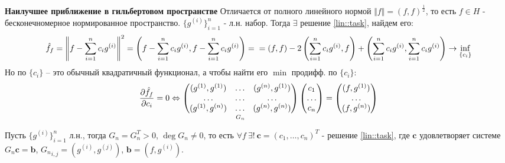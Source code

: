 \textbf{Наилучшее приближение в гильбертовом пространстве}
Отличается от полного линейного нормой $\Vert f\Vert=(f,f)^{\frac{1}{2}}$,
то есть $f\in H$ - бесконечномерное нормированное пространство.
$\{g^{(i)}\}^n_{i=1}$ - л.н. набор. Тогда
$\exists$ решение \eqref{lin::task}, найдем его:
\begin{equation*}
  \hat{f}_f=\left\Vert f-\sum_{i=1}^nc_ig^{(i)}\right\Vert^2 = \left(f-\sum_{i=1}^nc_ig^{(i)}, f-\sum_{i=1}^nc_ig^{(i)}\right)= \\
  = (f,f)-2\left(\sum_{i=1}^nc_ig^{(i)}, f\right)+\left(\sum_{i=1}^nc_ig^{(i)}, \sum_{i=1}^nc_ig^{(i)}\right)\rightarrow\inf_{\{c_i\}}
\end{equation*}
Но по $\{c_i\}$ -- это обычный квадратичный функционал, а чтобы найти его $\min$ продифф. по $\{c_i\}$:
\begin{equation*}
  \frac{\partial \hat{f}_f}{\partial c_i} = 0\Leftrightarrow  \\
  \underset{G_n}{\begin{pmatrix}
      (g^{(1)},g^{(1)}) & \ldots & (g^{(n)},g^{(1)}) \\
      \ldots            & \ldots & \ldots            \\
      (g^{(1)},g^{(n)}) & \ldots & (g^{(n)},g^{(n)})
    \end{pmatrix}}
  \begin{pmatrix}
    c_1    \\
    \ldots \\
    c_n
  \end{pmatrix} =
  \begin{pmatrix}
    (f,g^{(1)}) \\
    \ldots      \\
    (f,g^{(n)})
  \end{pmatrix}
\end{equation*}
\begin{theorem}
  Пусть $\{g^{(i)}\}_{i=1}^n$ л.н., тогда $G_n=G_n^T>0$, $\deg G_n\neq0$,
  то есть $\forall f\ \exists!\ \mathbf{c}=(c_1,\ldots,c_n)^T$ - решение \eqref{lin::task},
  где $\mathbf{c}$ удовлетворяет системе $G_n\mathbf{c}=\mathbf{b}$,
  ${G_n}_{i,j}=(g^{(i)},g^{(j)})$, $\mathbf{b}=(f,g^{(i)})$.
\end{theorem}
